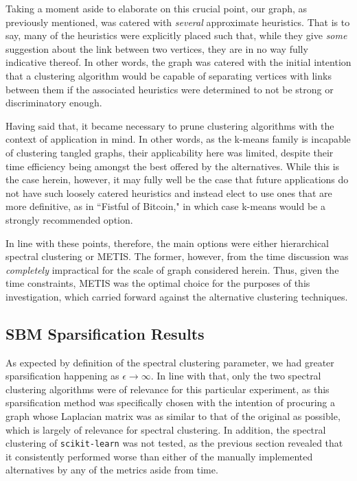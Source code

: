 \documentclass{article}
\begin{document}
Taking a moment aside to elaborate on this crucial point, our graph, as previously mentioned, was catered with \textit{several} approximate heuristics. That is to say, many of the heuristics were explicitly placed such that, while they give \textit{some} suggestion about the link between two vertices, they are in no way fully indicative thereof. In other words, the graph was catered with the initial intention that a clustering algorithm would be capable of separating vertices with links between them if the associated heuristics were determined to not be strong or discriminatory enough. 

Having said that, it became necessary to prune clustering algorithms with the context of application in mind. In other words, as the k-means family is incapable of clustering tangled graphs, their applicability here was limited, despite their time efficiency being amongst the best offered by the alternatives. While this is the case herein, however, it may fully well be the case that future applications do not have such loosely catered heuristics and instead elect to use ones that are more definitive, as in ``Fistful of Bitcoin," in which case k-means would be a strongly recommended option.

In line with these points, therefore, the main options were either hierarchical spectral clustering or METIS. The former, however, from the time discussion was \textit{completely} impractical for the scale of graph considered herein. Thus, given the time constraints, METIS was the optimal choice for the purposes of this investigation, which carried forward against the alternative clustering techniques.

\subsection{SBM Sparsification Results}
As expected by definition of the spectral clustering parameter, we had greater sparsification happening as $\epsilon\rightarrow\infty$. In line with that, only the two spectral clustering algorithms were of relevance for this particular experiment, as this sparsification method was specifically chosen with the intention of procuring a graph whose Laplacian matrix was as similar to that of the original as possible, which is largely of relevance for spectral clustering. In addition, the spectral clustering of \texttt{scikit-learn} was not tested, as the previous section revealed that it consistently performed worse than either of the manually implemented alternatives by any of the metrics aside from time. 
\end{document}
